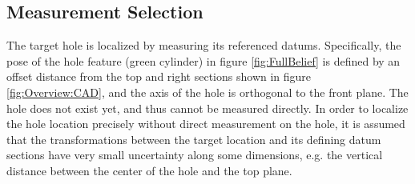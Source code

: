\documentclass[../thesis.tex]{subfiles}
\begin{document}
\subsection{Measurement Selection}

The target hole is localized by measuring its referenced datums. 
Specifically, the pose of the hole feature (green cylinder) in figure \ref{fig:FullBelief} is defined by an offset distance from the top and right sections shown in figure \ref{fig:Overview:CAD}, and the axis of the hole is orthogonal to the front plane. 
The hole does not exist yet, and thus cannot be measured directly.
In order to localize the hole location precisely without direct measurement on the hole, it is assumed that the transformations between the target location and its defining datum sections have very small uncertainty along some dimensions, e.g. the vertical distance between the center of the hole and the top plane.
\end{document}
